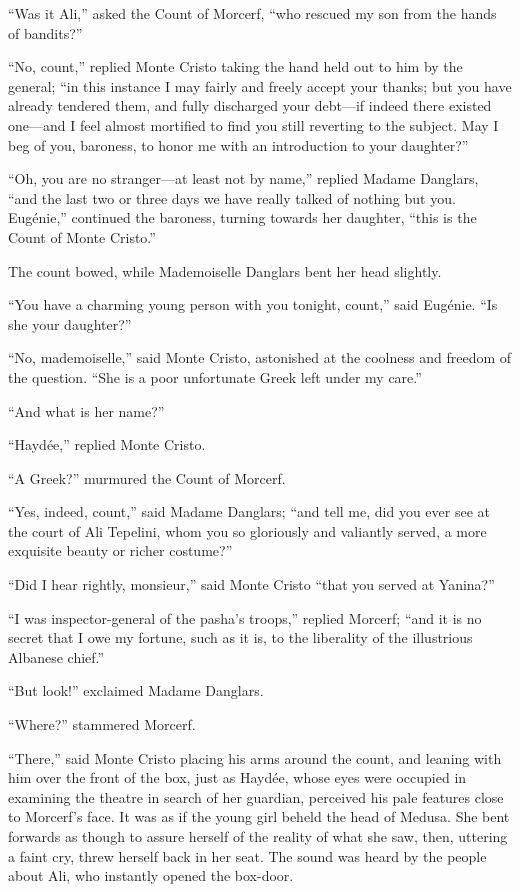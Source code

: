 “Was it Ali,” asked the Count of Morcerf, “who rescued my son from the
hands of bandits?”

“No, count,” replied Monte Cristo taking the hand held out to him by
the general; “in this instance I may fairly and freely accept your
thanks; but you have already tendered them, and fully discharged your
debt—if indeed there existed one—and I feel almost mortified to find
you still reverting to the subject. May I beg of you, baroness, to
honor me with an introduction to your daughter?”

“Oh, you are no stranger—at least not by name,” replied Madame
Danglars, “and the last two or three days we have really talked of
nothing but you. Eugénie,” continued the baroness, turning towards her
daughter, “this is the Count of Monte Cristo.”

The count bowed, while Mademoiselle Danglars bent her head slightly.

“You have a charming young person with you tonight, count,” said
Eugénie. “Is she your daughter?”

“No, mademoiselle,” said Monte Cristo, astonished at the coolness and
freedom of the question. “She is a poor unfortunate Greek left under my
care.”

“And what is her name?”

“Haydée,” replied Monte Cristo.

“A Greek?” murmured the Count of Morcerf.

“Yes, indeed, count,” said Madame Danglars; “and tell me, did you ever
see at the court of Ali Tepelini, whom you so gloriously and valiantly
served, a more exquisite beauty or richer costume?”

“Did I hear rightly, monsieur,” said Monte Cristo “that you served at
Yanina?”

“I was inspector-general of the pasha’s troops,” replied Morcerf; “and
it is no secret that I owe my fortune, such as it is, to the liberality
of the illustrious Albanese chief.”

“But look!” exclaimed Madame Danglars.

“Where?” stammered Morcerf.

“There,” said Monte Cristo placing his arms around the count, and
leaning with him over the front of the box, just as Haydée, whose eyes
were occupied in examining the theatre in search of her guardian,
perceived his pale features close to Morcerf’s face. It was as if the
young girl beheld the head of Medusa. She bent forwards as though to
assure herself of the reality of what she saw, then, uttering a faint
cry, threw herself back in her seat. The sound was heard by the people
about Ali, who instantly opened the box-door.

